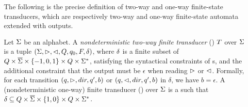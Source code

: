 The following is the precise definition of two-way and one-way finite-state transducers, which 
are respectively two-way and one-way finite-state automata extended with outputs.  
\begin{definition}
    Let $\Sigma$ be an alphabet.
    A \emph{nondeterministic two-way finite  transducer} (\FFT{}) $T$  over 
    $\Sigma$ is a tuple $(\Sigma, \vartriangleright, \vartriangleleft, Q, q_0, F, \delta)$, where $\delta$ is  a finite subset of $Q \times 
    \overline{\Sigma}\times \{-1, 0, 1\}\times 
    Q \times \Sigma^*$, satisfying the syntactical constraints of \FFA{}s, and the additional constraint that the output must be $\epsilon$ when reading $\vartriangleright$ or $\vartriangleleft$. Formally, for each transition $(q, \vartriangleright, dir, q', b)$ or $(q, \vartriangleleft, dir, q', b)$ in $\delta$, we have $b=\epsilon$.
%
%
    A (nondeterministic one-way) finite transducer (\FT{}) over
    $\Sigma$
    is a \FFT{} such that 
     $\delta \subseteq Q \times \overline{\Sigma} \times
    \{1,0\} \times Q \times \Sigma^*$.
\end{definition}


 



